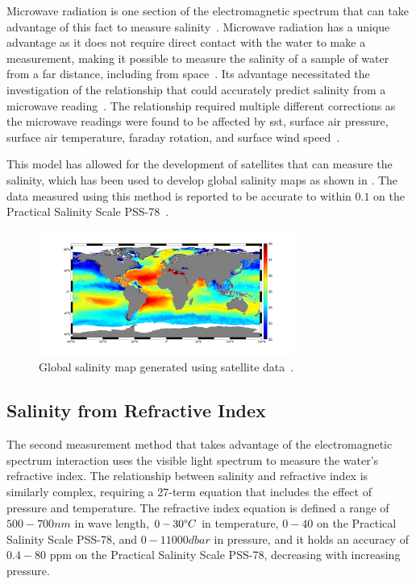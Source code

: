 Microwave radiation is one section of the electromagnetic spectrum that can take advantage of this fact to measure salinity~\cite{swift_considerations_for_microwave_salinity_1983}.
Microwave radiation has a unique advantage as it does not require direct contact with the water to make a measurement, making it possible to measure the salinity of a sample of water from a far distance, including from space~\cite{gabarro_microwave_salinity_2004}.
Its advantage necessitated the investigation of the relationship that could accurately predict salinity from a microwave reading~\cite{gabarro_microwave_salinity_2004}.
The relationship required multiple different corrections as the microwave readings were found to be affected by \gls{sst}, surface air pressure, surface air temperature, faraday rotation, and surface wind speed~\cite{yueh_microwave_salinity_error_sources_2001}.

This model has allowed for the development of satellites that can measure the salinity, which has been used to develop global salinity maps as shown in .
The data measured using this method is reported to be accurate to within $0.1$ on the Practical Salinity Scale PSS-78~\cite{yueh_microwave_salinity_error_sources_2001}.
\begin{figure}[ht]
    \centering
    \includegraphics[width=0.75\textwidth]{Figures/salinity_distribution}
    \caption{Global salinity map generated using satellite data~\cite{esa_mapping_salty_waters_2019}.}
    \label{fig:satellite_salinity_map} %
\end{figure}

\subsection{Salinity from Refractive Index}

The second measurement method that takes advantage of the electromagnetic spectrum interaction uses the visible light spectrum to measure the water's refractive index.
The relationship between salinity and refractive index is similarly complex, requiring a 27-term equation that includes the effect of pressure and temperature.
The refractive index equation is defined a range of $500-700nm$ in wave length, $0-30\degree C$ in temperature, $0-40$ on the Practical Salinity Scale PSS-78, and $0-11000 dbar$ in pressure, and it holds an accuracy of $0.4-80$ \gls{ppm} on the Practical Salinity Scale PSS-78, decreasing with increasing pressure.~\cite{millard_index_of_refraction_algorithm_1990}

